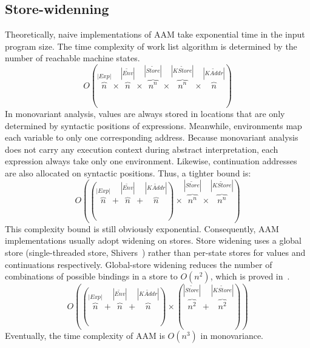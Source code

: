 \documentclass{article}
\begin{document}
\subsection{Store-widenning}
\label{sub:Store-widenning}
Theoretically, naive implementations of AAM take exponential time in the input program size.
The time complexity of work list algorithm is determined by the number of reachable machine states.
\[
O(
\overbrace{n}^{|Exp|} \times \overbrace{n}^{|\widetilde{Env}|} \times \overbrace{n^n}^{|\widetilde{Store}|}
\times \overbrace{n^n}^{|\widetilde{KStore}|} \times \overbrace{n}^{|\widetilde{KAddr}|}
)
\]
In monovariant analysis, values are always stored in locations that are only determined by syntactic positions of expressions.
Meanwhile, environments map each variable to only one corresponding address.
Because monovariant analysis does not carry any execution context during abstract interpretation, each expression always take only one environment.
Likewise, continuation addresses are also allocated on syntactic positions.
Thus, a tighter bound is:
\[
O(
(\overbrace{n}^{|Exp|} + \overbrace{n}^{|\widetilde{Env}|} +  \overbrace{n}^{|\widetilde{KAddr}|}) \times \overbrace{n^n}^{|\widetilde{Store}|} \times \overbrace{n^n}^{|\widetilde{KStore}|}
)
\]
This complexity bound is still obviously exponential.
Consequently, AAM implementations usually adopt widening on stores.
Store widening uses a global store (single-threaded store, Shivers~\cite{shivers1991control}) rather than per-state stores for values and continuations respectively.
Global-store widening reduces the number of combinations of possible bindings in a store to $O(n^2)$,
which is proved in~\cite{van2010abstracting, gilray2016pushdown}.
\[
O(
(\overbrace{n}^{|Exp|} + \overbrace{n}^{|\widetilde{Env}|} +  \overbrace{n}^{|\widetilde{KAddr}|}) \times (\overbrace{n^2}^{|\widetilde{Store}|} + \overbrace{n^2}^{|\widetilde{KStore}|})
)
\]
Eventually, the time complexity of AAM is $O(n^3)$ in monovariance.
\end{document}
